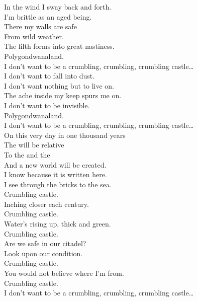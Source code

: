 In the wind I sway back and forth. \\
I'm brittle as an aged  being. \\
There my walls are safe \\
From wild weather. \\
The filth forms into great nastiness. \\
Polygondwanaland. \\

I don't want to be a crumbling, crumbling, crumbling castle… \\

I don't want to fall into dust. \\
I don't want nothing but to live on. \\
The ache inside my keep spurs me on. \\
I don't want to be invisible. \\
Polygondwanaland. \\

I don't want to be a crumbling, crumbling, crumbling castle… \\

On this very day in one thousand years \\
The  will be relative \\
To the  and the  \\
And a new world will be created. \\
I know because it is written here. \\

I see through the bricks to the sea. \\
Crumbling castle. \\
Inching closer each century. \\
Crumbling castle. \\
Water's rising up, thick and green. \\
Crumbling castle. \\
Are we safe in our citadel? \\
Look upon our condition. \\
Crumbling castle. \\
You would not believe where I'm from. \\
Crumbling castle. \\

I don't want to be a crumbling, crumbling, crumbling castle… \\


